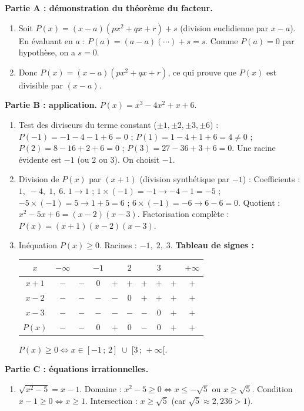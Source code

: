 \documentclass[11pt]{article}
\begin{document}
\begin{corrige}
\textbf{Partie A : démonstration du théorème du facteur.}
\begin{enumerate}
\item Soit $P(x) = (x-a)(px^2+qx+r) + s$ (division euclidienne par $x-a$). En évaluant en $a$ : $P(a) = (a-a)(\cdots) + s = s$. Comme $P(a)=0$ par hypothèse, on a $s=0$.
\item Donc $P(x) = (x-a)(px^2+qx+r)$, ce qui prouve que $P(x)$ est divisible par $(x-a)$.
\end{enumerate}
\textbf{Partie B : application.}
$P(x)=x^3-4x^2+x+6$.
\begin{enumerate}[resume]
\item Test des diviseurs du terme constant ($\pm 1, \pm 2, \pm 3, \pm 6$) :
$P(-1)=-1-4-1+6=0$ ; $P(1)=1-4+1+6=4\neq0$ ; $P(2)=8-16+2+6=0$ ; $P(3)=27-36+3+6=0$.
Une racine évidente est $-1$ (ou $2$ ou $3$). On choisit $-1$.
\item Division de $P(x)$ par $(x+1)$ (division synthétique par $-1$) :
Coefficients : $1,\;-4,\;1,\;6$.
$1 \rightarrow 1$ ; $1\times(-1)=-1 \rightarrow -4-1=-5$ ; $-5\times(-1)=5 \rightarrow 1+5=6$ ; $6\times(-1)=-6 \rightarrow 6-6=0$.
Quotient : $x^2-5x+6 = (x-2)(x-3)$.
Factorisation complète : $\boxed{P(x) = (x+1)(x-2)(x-3)}$.
\item Inéquation $P(x) \ge 0$. Racines : $-1,\;2,\;3$. \textbf{Tableau de signes :}
\begin{center}
\begin{tabular}{|c|ccccccccc|}\hline
$x$ & $-\infty$ & & $-1$ & & $2$ & & $3$ & & $+\infty$ \\ \hline
$x+1$ & $-$ & $-$ & $0$ & $+$ & $+$ & $+$ & $+$ & $+$ & $+$ \\
$x-2$ & $-$ & $-$ & $-$ & $-$ & $0$ & $+$ & $+$ & $+$ & $+$ \\
$x-3$ & $-$ & $-$ & $-$ & $-$ & $-$ & $-$ & $0$ & $+$ & $+$ \\ \hline
$P(x)$ & $-$ & $-$ & $0$ & $+$ & $0$ & $-$ & $0$ & $+$ & $+$ \\ \hline
\end{tabular}
\end{center}
$P(x) \ge 0 \iff x \in \boxed{[-1\,;\,2] \;\cup\; [3\,;\,+\infty[}$.
\end{enumerate}
\textbf{Partie C : équations irrationnelles.}
\begin{enumerate}[resume]
\item $\sqrt{x^2-5} = x-1$.
Domaine : $x^2-5 \ge 0 \iff x \le -\sqrt5$ ou $x \ge \sqrt5$. Condition $x-1 \ge 0 \iff x \ge 1$. Intersection : $x \ge \sqrt5$ (car $\sqrt5 \approx 2,236 > 1$).

\end{enumerate}
\end{corrige}
\end{document}
